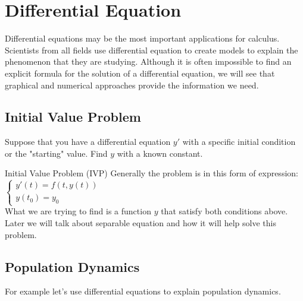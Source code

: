 \documentclass[letterpaper,10pt,twoside,twocolumn,openany]{book}
\begin{document}
\chapter{Differential Equation}
Differential equations may be the most important applications for calculus. Scientists from all fields use differential equation to create models to explain the phenomenon that they are studying. Although it is often impossible to find an explicit formula for the solution of a differential equation, we will see that graphical and numerical approaches provide the information we need.

\section{Initial Value Problem}
Suppose that you have a differential equation $y'$ with a specific initial condition or the "starting" value. Find $y$ with a known constant.
\begin{DndSidebar}{Initial Value Problem (IVP)}
    Generally the problem is in this form of expression:
    {\centering
    $\begin{cases}
        y'(t) = f(t,y(t))\\
        y(t_0) = y_0 
    \end{cases}$\\}
    What we are trying to find is a function $y$ that satisfy both conditions above.
    Later we will talk about separable equation and how it will help solve this problem.
\end{DndSidebar} 


\section{Population Dynamics}
For example let's use differential equations to explain population dynamics.
\end{document}

